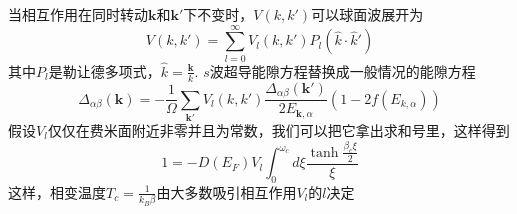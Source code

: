 \documentclass{article}
\numberwithin{equation}{subsection}
\newcommand{\mk}{\mathbf{k}}
\begin{document}
当相互作用在同时转动$\mk$和$\mk'$下不变时，$V(k,k')$可以球面波展开为
\begin{equation}
    V(k,k')=\sum_{l=0}^{\infty}V_{l}(k,k')P_l(\hat{k}\cdot\hat{k}')
\end{equation}
其中$P_l$是勒让德多项式，$\hat{k}=\frac{\mk}{k}$. $s$波超导能隙方程替换成一般情况的能隙方程
\begin{equation}
    \Delta_{\alpha\beta}(\mk)=-\frac{1}{\Omega}\sum_{\mk'}V_{l}(k,k')\frac{\Delta_{\alpha\beta}(\mk')}{2E_{\mk,\alpha}}(1-2f(E_{k,\alpha}))
\end{equation}
假设$V_l$仅仅在费米面附近非零并且为常数，我们可以把它拿出求和号里，这样得到
\begin{equation}
    1=-D(E_F)V_l\int_0^{\omega_c}d\xi\frac{\tanh\frac{\beta_c\xi}{2}}{\xi}
\end{equation}
这样，相变温度$T_c=\frac{1}{k_B\beta}$由大多数吸引相互作用$V_l$的$l$决定



\end{document}

